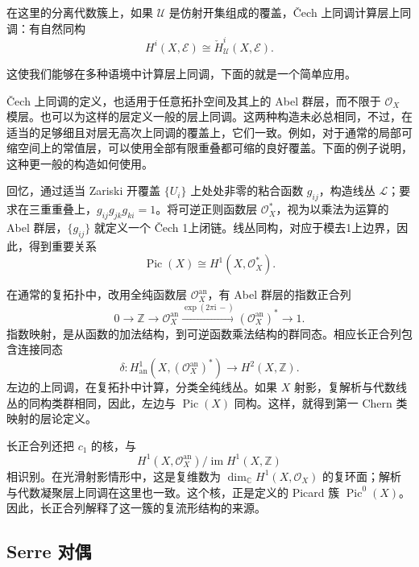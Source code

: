 \begin{proposition}\label{prop:4.64}
在这里的分离代数簇上，如果 $\mathcal{U}$ 是仿射开集组成的覆盖，\v Cech 上同调计算层上同调：有自然同构
\[
H^i(X,\mathcal{E})\cong\check H^i_{\mathcal{U}}(X,\mathcal{E}).
\]
\end{proposition}
这使我们能够在多种语境中计算层上同调，下面的就是一个简单应用。

\v Cech 上同调的定义，也适用于任意拓扑空间及其上的 Abel 群层，而不限于 $\mathcal{O}_X$ 模层。也可以为这样的层定义一般的层上同调。这两种构造未必总相同，不过，在适当的足够细且对层无高次上同调的覆盖上，它们一致。例如，对于通常的局部可缩空间上的常值层，可以使用全部有限重叠都可缩的良好覆盖。下面的例子说明，这种更一般的构造如何使用。

\begin{example}\label{ex:4.65}
回忆，通过适当 Zariski 开覆盖 $\{U_i\}$ 上处处非零的粘合函数 $g_{ij}$，构造线丛 $\mathcal{L}$；要求在三重重叠上，$g_{ij}g_{jk}g_{ki}=1$。将可逆正则函数层 $\mathcal{O}_X^*$，视为以乘法为运算的 Abel 群层，$\{g_{ij}\}$ 就定义一个 \v Cech 1上闭链。线丛同构，对应于模去1上边界，因此，得到重要关系
\[
\operatorname{Pic}(X)\cong H^1(X,\mathcal{O}_X^*).
\]

在通常的复拓扑中，改用全纯函数层 $\mathcal{O}_X^{\mathrm{an}}$，有 Abel 群层的指数正合列
\[
0\longrightarrow\mathbb{Z}\longrightarrow\mathcal{O}_X^{\mathrm{an}}
\xrightarrow{\exp(2\pi\mathrm{i}\,-)}
(\mathcal{O}_X^{\mathrm{an}})^*\longrightarrow1.
\]
指数映射，是从函数的加法结构，到可逆函数乘法结构的群同态。相应长正合列包含连接同态
\[
\delta\colon H^1_{\mathrm{an}}(X,(\mathcal{O}_X^{\mathrm{an}})^*)
\longrightarrow H^2(X,\mathbb{Z}).
\]
左边的上同调，在复拓扑中计算，分类全纯线丛。如果 $X$ 射影，复解析与代数线丛的同构类群相同，因此，左边与 $\operatorname{Pic}(X)$ 同构。这样，就得到第一 Chern 类映射的层论定义。

长正合列还把 $c_1$ 的核，与
\[
H^1(X,\mathcal{O}_X^{\mathrm{an}})
\big/\operatorname{im}H^1(X,\mathbb{Z})
\]
相识别。在光滑射影情形中，这是复维数为 $\dim_{\mathbb{C}}H^1(X,\mathcal{O}_X)$ 的复环面；解析与代数凝聚层上同调在这里也一致。这个核，正是定义的 Picard 簇 $\operatorname{Pic}^0(X)$。因此，长正合列解释了这一簇的复流形结构的来源。
\end{example}

\subsection{Serre 对偶}\label{sec:4.5.2}

